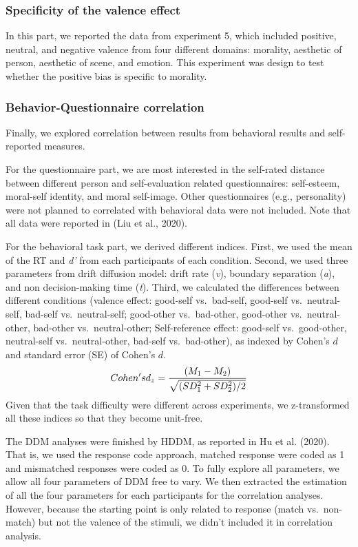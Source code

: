 \documentclass[
  english,
  man]{apa6}
\begin{document}
\hypertarget{specificity-of-the-valence-effect}{%
\subsubsection{Specificity of the valence effect}\label{specificity-of-the-valence-effect}}

In this part, we reported the data from experiment 5, which included positive, neutral, and negative valence from four different domains: morality, aesthetic of person, aesthetic of scene, and emotion. This experiment was design to test whether the positive bias is specific to morality.

\hypertarget{behavior-questionnaire-correlation}{%
\subsubsection{Behavior-Questionnaire correlation}\label{behavior-questionnaire-correlation}}

Finally, we explored correlation between results from behavioral results and self-reported measures.

For the questionnaire part, we are most interested in the self-rated distance between different person and self-evaluation related questionnaires: self-esteem, moral-self identity, and moral self-image. Other questionnaires (e.g., personality) were not planned to correlated with behavioral data were not included. Note that all data were reported in (Liu et al., 2020).

For the behavioral task part, we derived different indices. First, we used the mean of the RT and \emph{d'} from each participants of each condition. Second, we used three parameters from drift diffusion model: drift rate (\emph{v}), boundary separation (\emph{a}), and non decision-making time (\emph{t}). Third, we calculated the differences between different conditions (valence effect: good-self vs.~bad-self, good-self vs.~neutral-self, bad-self vs.~neutral-self; good-other vs.~bad-other, good-other vs.~neutral-other, bad-other vs.~neutral-other; Self-reference effect: good-self vs.~good-other, neutral-self vs.~neutral-other, bad-self vs.~bad-other), as indexed by Cohen's \(d\) and standard error (SE) of Cohen's \(d\).
\[ Cohen's \space d_{z} = \frac {(M_{1} - M_{2})} {\sqrt{(SD_{1}^2 + SD_{2}^2)/2}}\]
Given that the task difficulty were different across experiments, we z-transformed all these indices so that they become unit-free.

The DDM analyses were finished by HDDM, as reported in Hu et al. (2020). That is, we used the response code approach, matched response were coded as 1 and mismatched responses were coded as 0. To fully explore all parameters, we allow all four parameters of DDM free to vary. We then extracted the estimation of all the four parameters for each participants for the correlation analyses. However, because the starting point is only related to response (match vs.~non-match) but not the valence of the stimuli, we didn't included it in correlation analysis.
\end{document}

